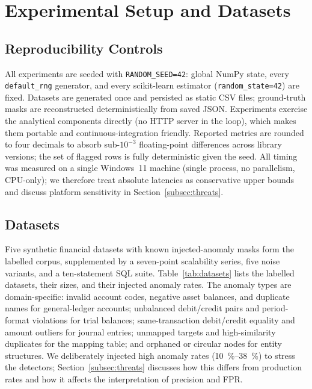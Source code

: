 \documentclass{ieeeaccess}
\begin{document}
\section{Experimental Setup and Datasets}
\label{sec:setup}

\subsection{Reproducibility Controls}
All experiments are seeded with \texttt{RANDOM\_SEED=42}: global NumPy state, every \texttt{default\_rng} generator, and
every scikit-learn estimator (\texttt{random\_state=42}) are fixed. Datasets are generated once and persisted as static
CSV files; ground-truth masks are reconstructed deterministically from saved JSON. Experiments exercise the analytical
components directly (no HTTP server in the loop), which makes them portable and continuous-integration friendly. Reported
metrics are rounded to four decimals to absorb sub-$10^{-3}$ floating-point differences across library versions; the set
of flagged rows is fully deterministic given the seed. All timing was measured on a single Windows~11 machine (single
process, no parallelism, CPU-only); we therefore treat absolute latencies as conservative upper bounds and discuss
platform sensitivity in Section~\ref{subsec:threats}.

\subsection{Datasets}
\label{subsec:datasets}
Five synthetic financial datasets with known injected-anomaly masks form the labelled corpus, supplemented by a
seven-point scalability series, five noise variants, and a ten-statement SQL suite.
Table~\ref{tab:datasets} lists the labelled datasets, their sizes, and their injected anomaly rates. The anomaly types are
domain-specific: invalid account codes, negative asset balances, and duplicate names for general-ledger accounts;
unbalanced debit/credit pairs and period-format violations for trial balances; same-transaction debit/credit equality and
amount outliers for journal entries; unmapped targets and high-similarity duplicates for the mapping table; and orphaned or
circular nodes for entity structures. We deliberately injected high anomaly rates (\SIrange{10}{38}{\percent}) to stress
the detectors; Section~\ref{subsec:threats} discusses how this differs from production rates and how it affects the
interpretation of precision and FPR.
\end{document}
